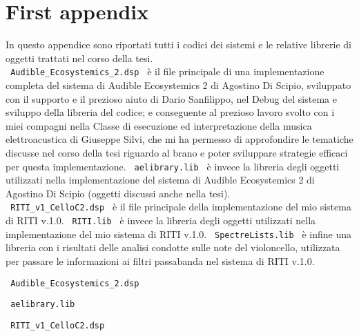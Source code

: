 \section{First appendix}

In questo appendice sono riportati tutti i codici dei sistemi
e le relative librerie di oggetti trattati nel corso della tesi. \\
\verb| Audible_Ecosystemics_2.dsp | è il file principale di una implementazione 
completa del sistema di Audible Ecosystemics 2 di Agostino Di Scipio, sviluppato con il supporto
e il prezioso aiuto di Dario Sanfilippo, nel Debug del sistema e sviluppo della libreria del codice; 
e conseguente al prezioso lavoro svolto con i miei compagni nella Classe di esecuzione ed interpretazione 
della musica elettroacustica di Giuseppe Silvi, che mi ha permesso di approfondire le tematiche
discusse nel corso della tesi riguardo al brano e poter sviluppare strategie efficaci per questa implementazione.
\verb| aelibrary.lib | è invece la libreria degli oggetti utilizzati nella implementazione del sistema
di Audible Ecosystemics 2 di Agostino Di Scipio (oggetti discussi anche nella tesi). \\
\verb| RITI_v1_CelloC2.dsp | è il file principale della implementazione 
del mio sistema di RITI v.1.0. \verb| RITI.lib | è invece la libreria degli oggetti utilizzati nella 
implementazione del mio sistema di RITI v.1.0. \verb| SpectreLists.lib | è infine una libreria
con i risultati delle analisi condotte sulle note del violoncello, utilizzata per passare le informazioni
ai filtri passabanda nel sistema di RITI v.1.0. \\
\clearpage


\begin{center} \Large \verb| Audible_Ecosystemics_2.dsp | \normalsize \\
    \vspace{0.2cm} \end{center}

\clearpage

\begin{center} \Large \verb| aelibrary.lib | \normalsize \\
    \vspace{0.2cm} \end{center}

\clearpage

\begin{center} \Large \verb| RITI_v1_CelloC2.dsp | \normalsize \\
    \vspace{0.2cm} \end{center}

\clearpage

